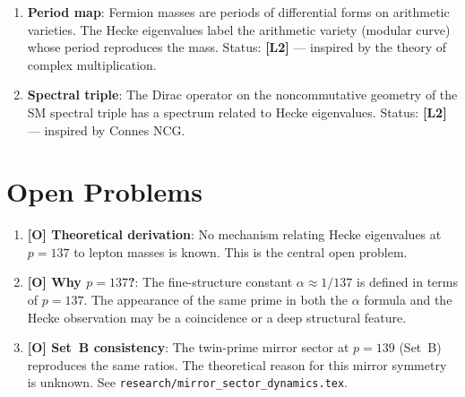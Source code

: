 \documentclass[11pt,a4paper]{article}
\begin{document}
\begin{enumerate}
  \item \textbf{Period map}: Fermion masses are periods of differential forms
    on arithmetic varieties.  The Hecke eigenvalues label the arithmetic
    variety (modular curve) whose period reproduces the mass.
    Status: \textbf{[L2]} — inspired by the theory of complex multiplication.

  \item \textbf{Spectral triple}: The Dirac operator on the noncommutative
    geometry of the SM spectral triple has a spectrum related to Hecke
    eigenvalues.  Status: \textbf{[L2]} — inspired by Connes NCG.
\end{enumerate}

\section{Open Problems}
\label{sec:open}

\begin{enumerate}
  \item \textbf{[O] Theoretical derivation}: No mechanism relating Hecke
    eigenvalues at $p = 137$ to lepton masses is known.  This is the
    central open problem.

  \item \textbf{[O] Why $p = 137$?}: The fine-structure constant
    $\alpha \approx 1/137$ is defined in terms of $p = 137$.  The
    appearance of the same prime in both the $\alpha$ formula and the
    Hecke observation may be a coincidence or a deep structural feature.

  \item \textbf{[O] Set~B consistency}: The twin-prime mirror sector at
    $p = 139$ (Set~B) reproduces the same ratios.  The theoretical reason
    for this mirror symmetry is unknown.  See
    \texttt{research/mirror\_sector\_dynamics.tex}.
\end{enumerate}
\end{document}
